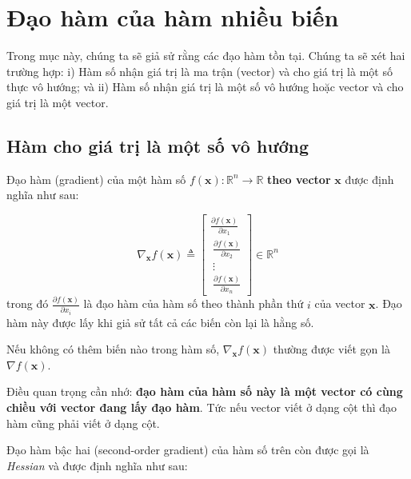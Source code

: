 \documentclass[12pt]{article}
\begin{document}
 
 
 
\section{Đạo hàm của hàm nhiều biến }
Trong mục này, chúng ta sẽ giả sử rằng các đạo hàm tồn tại. Chúng ta sẽ xét hai trường hợp: i) Hàm số nhận giá trị là ma trận (vector) và cho giá trị là một số thực vô hướng; và ii) Hàm số nhận giá trị là một số vô hướng hoặc vector và cho giá trị là một vector.  
 
 
\subsection{Hàm cho giá trị là một số vô hướng}
 
Đạo hàm (gradient) của một hàm số $f(\mathbf{x}): \mathbb{R}^n \rightarrow \mathbb{R}$ \textbf{theo vector} $\mathbf{x}$ được định nghĩa như sau:  
 
\begin{equation} 
	\label{eqn:grvector1}
	\nabla_{\mathbf{x}} f(\mathbf{x}) \triangleq  
	\left[ 
	\begin{matrix} 
	\frac{\partial f(\mathbf{x})}{\partial x_1} \\\ 
	\frac{\partial f(\mathbf{x})}{\partial x_2} \\\ 
	\vdots \\\ 
	\frac{\partial f(\mathbf{x})}{\partial x_n} 
	\end{matrix} 
	\right] \in \mathbb{R}^n 
\end{equation} 
trong đó $\frac{\partial f(\mathbf{x})}{\partial x_i}$ là đạo hàm của hàm số theo thành phần thứ $i$ của vector $\mathbf{x}$. Đạo hàm này được lấy khi giả sử tất cả các biến còn lại là hằng số. 
 
Nếu không có thêm biến nào trong hàm số, $\nabla_{\mathbf{x}}f(\mathbf{x})$ thường được viết gọn là $\nabla f(\mathbf{x})$. 
 
Điều quan trọng cần nhớ: \textbf{đạo hàm của hàm số này là một vector có cùng chiều với vector đang lấy đạo hàm}. Tức nếu vector viết ở dạng cột thì đạo hàm cũng phải viết ở dạng cột.  
 
Đạo hàm bậc hai (second-order gradient) của hàm số trên còn được gọi là \textit{Hessian} và được định nghĩa như sau:  
 
\end{document}
